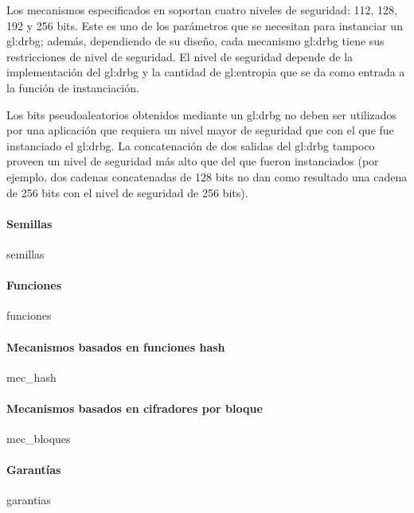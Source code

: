 Los mecanismos especificados en \cite{nist_aleatorios} soportan cuatro niveles
de seguridad: 112, 128, 192 y 256 bits. Este es uno de los parámetros que
se necesitan para instanciar un \gls{gl:drbg}; además, dependiendo de su diseño,
cada mecanismo  \gls{gl:drbg} tiene sus restricciones de nivel de seguridad.
El nivel de seguridad depende de la implementación del \gls{gl:drbg} y la
cantidad de \gls{gl:entropia} que se da como entrada a la función de
instanciación.

Los bits pseudoaleatorios obtenidos mediante un \gls{gl:drbg} no deben ser
utilizados por una aplicación que requiera un nivel mayor de seguridad que con
el que fue instanciado el \gls{gl:drbg}. La concatenación de dos salidas del
\gls{gl:drbg} tampoco proveen un nivel de seguridad más alto que del que fueron
instanciados (por ejemplo, dos cadenas concatenadas de 128 bits no dan como
resultado una cadena de 256 bits con el nivel de seguridad de 256 bits).

\paragraph{Semillas}
{semillas}

\paragraph{Funciones}
{funciones}

\paragraph{Mecanismos basados en funciones hash}
{mec_hash}

\paragraph{Mecanismos basados en cifradores por bloque}
{mec_bloques}

\paragraph{Garantías}
{garantias}
